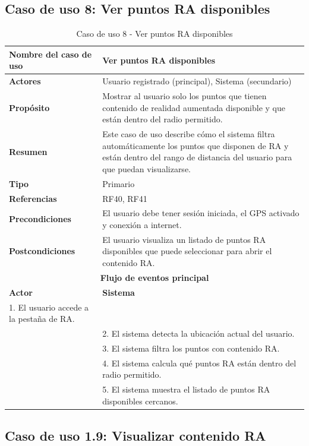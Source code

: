 \subsection{Caso de uso 8: Ver puntos RA disponibles}

\begin{table}[H]
\centering
\caption{Caso de uso 8 - Ver puntos RA disponibles}
\begin{tabular}{|p{4.5cm}|p{10.5cm}|}
\hline
\textbf{Nombre del caso de uso} & Ver puntos RA disponibles \\
\hline
\textbf{Actores} & Usuario registrado (principal), Sistema (secundario) \\
\hline
\textbf{Propósito} & Mostrar al usuario solo los puntos que tienen contenido de realidad aumentada disponible y que están dentro del radio permitido. \\
\hline
\textbf{Resumen} & Este caso de uso describe cómo el sistema filtra automáticamente los puntos que disponen de RA y están dentro del rango de distancia del usuario para que puedan visualizarse. \\
\hline
\textbf{Tipo} & Primario \\
\hline
\textbf{Referencias} & RF40, RF41 \\
\hline
\textbf{Precondiciones} & El usuario debe tener sesión iniciada, el GPS activado y conexión a internet. \\
\hline
\textbf{Postcondiciones} & El usuario visualiza un listado de puntos RA disponibles que puede seleccionar para abrir el contenido RA. \\
\hline
\multicolumn{2}{|c|}{\textbf{Flujo de eventos principal}} \\
\hline
\textbf{Actor} & \textbf{Sistema} \\
\hline
1. El usuario accede a la pestaña de RA. & \\
\hline
& 2. El sistema detecta la ubicación actual del usuario. \\
\hline
& 3. El sistema filtra los puntos con contenido RA. \\
\hline
& 4. El sistema calcula qué puntos RA están dentro del radio permitido. \\
\hline
& 5. El sistema muestra el listado de puntos RA disponibles cercanos. \\
\hline
\end{tabular}
\end{table}

\subsection{Caso de uso 1.9: Visualizar contenido RA}

